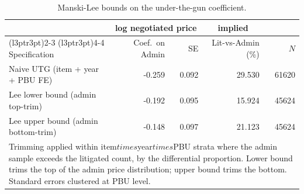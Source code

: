 \begin{table}

\caption{\label{tab:utg_lee_bounds}Manski-Lee bounds on the under-the-gun coefficient.}
\centering
\begin{tabular}[t]{lrrrr}
\toprule
\multicolumn{1}{c}{ } & \multicolumn{2}{c}{log negotiated price} & \multicolumn{1}{c}{implied} & \multicolumn{1}{c}{ } \\
\cmidrule(l{3pt}r{3pt}){2-3} \cmidrule(l{3pt}r{3pt}){4-4}
Specification & Coef.\ on Admin & SE & Lit-vs-Admin (\%) & $N$\\
\midrule
Naive UTG (item + year + PBU FE) & -0.259 & 0.092 & 29.530 & 61620\\
Lee lower bound (admin top-trim) & -0.192 & 0.095 & 15.924 & 45624\\
Lee upper bound (admin bottom-trim) & -0.148 & 0.097 & 21.123 & 45624\\
\bottomrule
\multicolumn{5}{l}{\rule{0pt}{1em}Trimming applied within item$times$year$times$PBU strata where the admin sample exceeds the litigated count, by the differential proportion. Lower bound trims the top of the admin price distribution; upper bound trims the bottom. Standard errors clustered at PBU level.}\\
\end{tabular}
\end{table}
